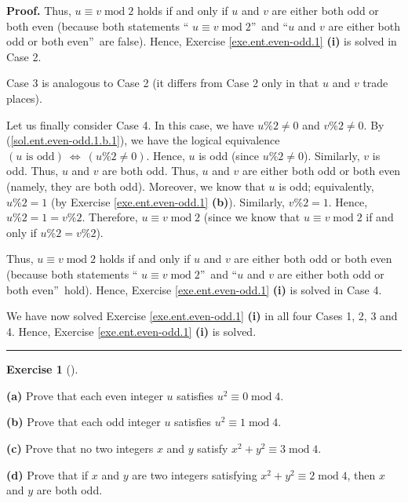 \documentclass[numbers=enddot,12pt,final,onecolumn,notitlepage]{scrartcl}%
\newcounter{exer}
\numberwithin{exer}{subsection}
\theoremstyle{definition}
\newtheorem{exmp}[exer]{Exercise}
\newenvironment{exercise}[1][]
{\begin{exmp}[#1]\begin{leftbar}}
{\end{leftbar}\end{exmp}}
\newenvironment{fineprint}{\begin{small}}{\end{small}}
\newenvironment{proof}[1][Proof]{\noindent\textbf{#1.} }{\ \rule{0.5em}{0.5em}}
\begin{document}
\begin{fineprint}
\begin{proof}
Thus, $u\equiv v\operatorname{mod}2$ holds if and only if $u$ and $v$ are
either both odd or both even (because both statements \textquotedblleft%
$u\equiv v\operatorname{mod}2$\textquotedblright\ and \textquotedblleft$u$ and
$v$ are either both odd or both even\textquotedblright\ are false). Hence,
Exercise \ref{exe.ent.even-odd.1} \textbf{(i)} is solved in Case 2.

Case 3 is analogous to Case 2 (it differs from Case 2 only in that $u$ and $v$
trade places).

Let us finally consider Case 4. In this case, we have $u\%2\neq0$ and
$v\%2\neq0$. By (\ref{sol.ent.even-odd.1.b.1}), we have the logical
equivalence $\left(  u\text{ is odd}\right)  \ \Longleftrightarrow\ \left(
u\%2\neq0\right)  $. Hence, $u$ is odd (since $u\%2\neq0$). Similarly, $v$ is
odd. Thus, $u$ and $v$ are both odd. Thus, $u$ and $v$ are either both odd or
both even (namely, they are both odd). Moreover, we know that $u$ is odd;
equivalently, $u\%2=1$ (by Exercise \ref{exe.ent.even-odd.1} \textbf{(b)}).
Similarly, $v\%2=1$. Hence, $u\%2=1=v\%2$. Therefore, $u\equiv
v\operatorname{mod}2$ (since we know that $u\equiv v\operatorname{mod}2$ if
and only if $u\%2=v\%2$).

Thus, $u\equiv v\operatorname{mod}2$ holds if and only if $u$ and $v$ are
either both odd or both even (because both statements \textquotedblleft%
$u\equiv v\operatorname{mod}2$\textquotedblright\ and \textquotedblleft$u$ and
$v$ are either both odd or both even\textquotedblright\ hold). Hence, Exercise
\ref{exe.ent.even-odd.1} \textbf{(i)} is solved in Case 4.

We have now solved Exercise \ref{exe.ent.even-odd.1} \textbf{(i)} in all four
Cases 1, 2, 3 and 4. Hence, Exercise \ref{exe.ent.even-odd.1} \textbf{(i)} is solved.
\end{proof}
\end{fineprint}

\begin{exercise}
\label{exe.ent.even-odd-sumsq}\textbf{(a)} Prove that each even integer $u$
satisfies $u^{2}\equiv0\operatorname{mod}4$.

\textbf{(b)} Prove that each odd integer $u$ satisfies $u^{2}\equiv
1\operatorname{mod}4$.

\textbf{(c)} Prove that no two integers $x$ and $y$ satisfy $x^{2}+y^{2}%
\equiv3\operatorname{mod}4$.

\textbf{(d)} Prove that if $x$ and $y$ are two integers satisfying
$x^{2}+y^{2}\equiv2\operatorname{mod}4$, then $x$ and $y$ are both odd.
\end{exercise}
\end{document}

